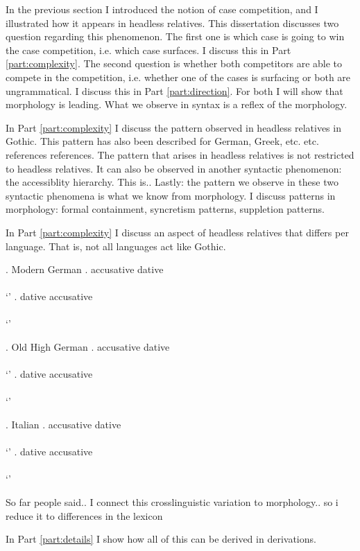 In the previous section I introduced the notion of case competition, and I illustrated how it appears in headless relatives. This dissertation discusses two question regarding this phenomenon.
The first one is which case is going to win the case competition, i.e. which case surfaces. I discuss this in Part \ref{part:complexity}.
The second question is whether both competitors are able to compete in the competition, i.e. whether one of the cases is surfacing or both are ungrammatical. I discuss this in Part \ref{part:direction}.
For both I will show that morphology is leading. What we observe in syntax is a reflex of the morphology.

In Part \ref{part:complexity} I discuss the pattern observed in headless relatives in Gothic. This pattern has also been described for German, Greek, etc. etc. references references.
The pattern that arises in headless relatives is not restricted to headless relatives. It can also be observed in another syntactic phenomenon: the accessiblity hierarchy. This is..
Lastly: the pattern we observe in these two syntactic phenomena is what we know from morphology. I discuss patterns in morphology: formal containment, syncretism patterns, suppletion patterns.

In Part \ref{part:complexity} I discuss an aspect of headless relatives that differs per language. That is, not all languages act like Gothic.

\ex. Modern German
\ag. accusative dative\\
 \\
 `'
\bg. dative accusative\\
 \\
 `'

 \ex. Old High German
 \ag. accusative dative\\
  \\
  `'
 \bg. dative accusative\\
  \\
  `'

  \ex. Italian
  \ag. accusative dative\\
   \\
   `'
  \bg. dative accusative\\
   \\
   `'

So far people said..
I connect this crosslinguistic variation to morphology.. so i reduce it to differences in the lexicon

In Part \ref{part:details} I show how all of this can be derived in derivations.
